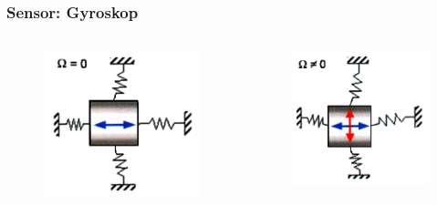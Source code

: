 \documentclass{beamer}
\begin{document}
\begin{frame}
    \frametitle{Sensor: Gyroskop} 
    \begin{columns}
        \begin{figure}[htpb]
            \centering
            \includegraphics[width=1\textwidth]{gyro8}
        \end{figure}
        \begin{figure}[htpb]
            \centering
            \includegraphics[width=1\textwidth]{gyro7}
        \end{figure}
    \end{columns}
\end{frame}
\end{document}
